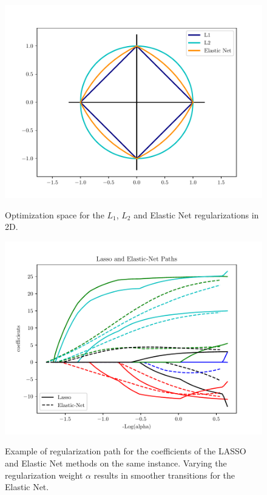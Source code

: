 \begin{figure}
  \caption{Optimization space for the $L_1$, $L_2$ and Elastic Net regularizations in 2D.}
  \centering
    \includegraphics[width=1\textwidth]{Figures/reg_norms.pdf}
  \label{fig:reg_norms}
\end{figure}

\begin{figure}
  \caption{Example of regularization path for the coefficients of the LASSO and Elastic Net methods on the same instance. Varying the regularization weight $\alpha$ results in smoother transitions for the Elastic Net.}
  \centering
    \includegraphics[width=1\textwidth]{Figures/enet_vs_lasso.pdf}
  \label{fig:enet_vs_lasso}
\end{figure}

